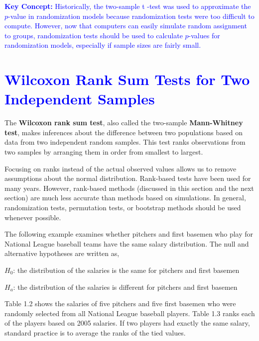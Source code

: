 \documentclass[
]{report}
\begin{document}
\textbf{\textcolor{blue}{Key Concept:}}
\textcolor{blue}{Historically, the two-sample t -test was used to approximate the $\scriptstyle p$-value in randomization models because randomization tests were too difficult to compute. However, now that computers can easily simulate random assignment to groups, randomization tests should be used to calculate $\scriptstyle p$-values for randomization models, especially if sample sizes are fairly small.}

\hypertarget{section-10}{%
\section{\texorpdfstring{\textcolor{blue}{Wilcoxon Rank Sum Tests for Two Independent Samples}}{}}\label{section-10}}

The \textbf{Wilcoxon rank sum test}, also called the two-sample \textbf{Mann-Whitney test}, makes inferences about the difference between two populations based on data from two independent random samples. This test ranks observations from two samples by arranging them in order from smallest to largest.

Focusing on ranks instead of the actual observed values allows us to remove assumptions about the normal distribution. Rank-based tests have been used for many years. However, rank-based methods (discussed in this section and the next section) are much less accurate than methods based on simulations. In general, randomization tests, permutation tests, or bootstrap methods should be used whenever possible.

The following example examines whether pitchers and first basemen who play for National League baseball teams have the same salary distribution. The null and alternative hypotheses are written as,

\begin{center}
$H_0$: the distribution of the salaries is the same for pitchers and first basemen
\end{center}

\begin{center}
$H_a$: the distribution of the salaries is different for pitchers and first basemen
\end{center}

Table 1.2 shows the salaries of five pitchers and five first basemen who were randomly selected from all National League baseball players. Table 1.3 ranks each of the players based on 2005 salaries. If two players had exactly the same salary, standard practice is to average the ranks of the tied values.
\end{document}
